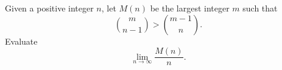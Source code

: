 Given a positive integer $n$, let $M(n)$ be the largest integer $m$ such that 
\[
\binom{m}{n-1} > \binom{m-1}{n}.
\]
Evaluate 
\[
\lim_{n \to \infty} \frac{M(n)}{n}.
\]
